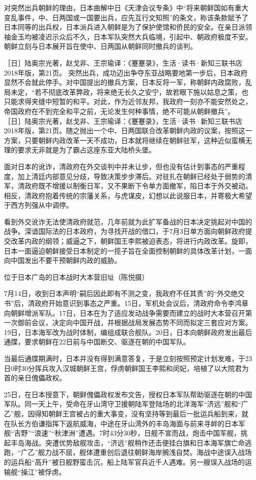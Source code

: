\documentclass[12pt,UTF8]{ctexbook}
\begin{document}
对突然出兵朝鲜的理由，日本曲解中日《天津会议专条》中“将来朝鲜国如有重大变乱事件，中、日两国或一国要出兵，应先互行文知照”的条文，称该条款赋予了日本同等的出兵权，日本派兵进入朝鲜是为了保护使馆和侨民的安全。在亲日派领袖金玉均被凌迟示众后不久，日本军队突然大兵临境，引起中、朝政府极度不安。朝鲜立刻与日本展开旨在使中、日两国从朝鲜同时撤兵的谈判。

［日］陆奥宗光著，赵戈非、王宗瑜译：《蹇蹇录》，生活·读书·新知三联书店2018年版，第21页。
突然出兵，成功迈出争夺东亚战略要地第一步后，日本政府显然不会就此停手。对中国提出的撤兵方案，日本反将一军，称朝鲜内政腐败，乱局未定，“若不彻底改革弊政，将来绝无长久之安宁，故若眼下施以姑息之策，也只能求得夹缝中短暂的和平。对此，作为近邻友邦，我政府一刻亦不能安然处之，帝国政府在不到完全和平之前，无论发生何种事情，绝不可能从朝鲜撤兵”。 ［日］陆奥宗光著，赵戈非、王宗瑜译：《蹇蹇录》，生活·读书·新知三联书店2018年版，第21页。随之抛出一个中、日两国联合改革朝鲜内政的议案，按照这一方案，只要朝鲜内政改革一天不成功，日本就将继续在朝鲜驻军，这种近似蛮横无理的要求无非就是为了霸占这座东亚大陆桥头堡。

面对日本的讹诈，清政府在外交谈判中并未让步，但也没有估计到事态的严重程度，加上清廷内部意见分歧，导致决策步步滞后。对驻扎在朝鲜已经处于弱势的清军，清政府既不增援以制衡日军，又不果断下令单方面撤军，陷日本于外交被动。相反，清政府抱着传统的宗藩关系，与虎谋皮，幻想以此说服日本，并寄极大希望于西方列强从中调停。

看到外交讹诈无法使清政府就范，几年前就为此扩军备战的日本决定挑起对中国的战争。深谙国际法的日本政府，为寻找开战的借口，于7月3日单方面向朝鲜政府提交改革内政的纲领；威逼之下，朝鲜国王李熙被迫表态，将进行内政改革。旋即，日本一面逼迫朝鲜接受日本制定的一揽子旨在全面控制朝鲜的具体改革计划，一面向中国发出不要干预朝鲜内政的威胁。


位于日本广岛的日本战时大本营旧址（陈悦摄）

7月14日，收到日本声明“嗣后因此即有不测之变，我政府不任其责”的“外交绝交书”后，清政府开始意识到事态之严重。15日，军机处会议后，清政府命令李鸿章向朝鲜增派军队。17日，日本在为了适应发动战争需要而建立的战时大本营召开第一次御前会议，决定向中国开战，并根据战局发展态势不同而拟定三套应对方案。19日，日本海军改为战时体制，编组成联合舰队。20日，日本向朝鲜政府发出最后通牒，要求朝鲜在22日前与中国断交、驱逐在朝的中国军队。

当最后通牒期满时，日本并没有得到满意答复，于是立刻按照预定计划发难，于23日0时30分挥兵攻入汉城朝鲜王宫，俘虏朝鲜国王李熙和闵妃，培植了以大院君为首的亲日傀儡政权。

25日，在日本授意下，朝鲜傀儡政权发布文告，授权日本军队帮助驱逐在朝的中国军队。同一天上午，受命在牙山湾守卫援朝陆军登陆场的北洋海军“济远”舰和“广乙”舰，因得知朝鲜王宫被占的重大事变，没有坚持等到最后一批运兵船到来，就在队长方伯谦指挥下返航威海，中途在牙山湾外的丰岛海面与前来寻衅的日本军舰“吉野”“浪速”“秋津洲”遭遇。7时43分30秒，日舰不宣而战，炮击中国军舰，挑起丰岛海战。突遭优势敌舰攻击，“济远”舰稍作还击便挂白旗和日本海军旗亡命逃跑，“广乙”舰力战不屈，舰体遭重创后退往朝鲜海岸搁浅自焚。海战中途误入战场的运兵船“高升”被日舰野蛮击沉，船上陆军官兵近千人遇难。另一艘误入战场的运输舰“操江”被俘虏。
\end{document}
